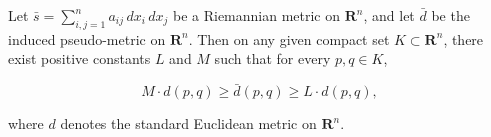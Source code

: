 Let $\bar{s} = \sum_{i,j=1}^{n} a_{ij} \, dx_i \, dx_j$ be a Riemannian metric on $\mathbf{R}^n$, and let $\bar{d}$ be the induced pseudo-metric on $\mathbf{R}^n$. Then on any given compact set $K \subset \mathbf{R}^n$, there exist positive constants $L$ and $M$ such that for every $p, q \in K$,

$$M \cdot d(p, q) \geq \bar{d}(p, q) \geq L \cdot d(p, q),$$

where $d$ denotes the standard Euclidean metric on $\mathbf{R}^n$.
